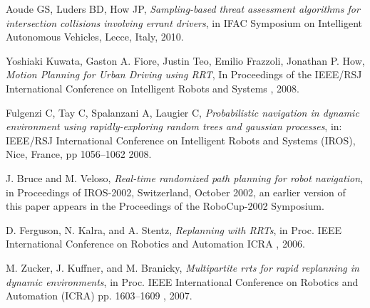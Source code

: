 \documentclass[MTech]{iitmdiss}
\begin{document}
\begin{thebibliography}{99}
	Aoude GS, Luders BD, How JP,
  \emph{Sampling-based threat assessment algorithms for intersection collisions involving errant drivers},
	in IFAC Symposium on Intelligent Autonomous Vehicles, Lecce, Italy,
	2010.	
	
	Yoshiaki Kuwata, Gaston A. Fiore, Justin Teo, Emilio Frazzoli, Jonathan P. How,
  \emph{Motion Planning for Urban Driving using RRT},
	In Proceedings of the IEEE/RSJ International Conference on Intelligent Robots and Systems , 
	2008.
	
	Fulgenzi C, Tay C, Spalanzani A, Laugier C,
  \emph{Probabilistic navigation in dynamic environment using rapidly-exploring random trees and gaussian processes},
	in: IEEE/RSJ International Conference on Intelligent Robots and Systems (IROS), Nice, France, pp 1056–1062
	2008.	
	
	J. Bruce and M. Veloso,
  \emph{Real-time randomized path planning for robot navigation},
	in Proceedings of IROS-2002, Switzerland, October 2002, an earlier version of this paper appears in the Proceedings of the RoboCup-2002 Symposium.
	
	D. Ferguson, N. Kalra, and A. Stentz,
  \emph{Replanning with RRTs},
	in Proc. IEEE International Conference on Robotics and Automation ICRA ,
	 2006. 
	 
	M. Zucker, J. Kuffner, and M. Branicky,
  \emph{Multipartite rrts for rapid replanning in dynamic environments},
	in Proc. IEEE International Conference on Robotics and Automation (ICRA) pp. 1603–1609 , 
	2007.

	
	
\end{thebibliography}


\end{document}
